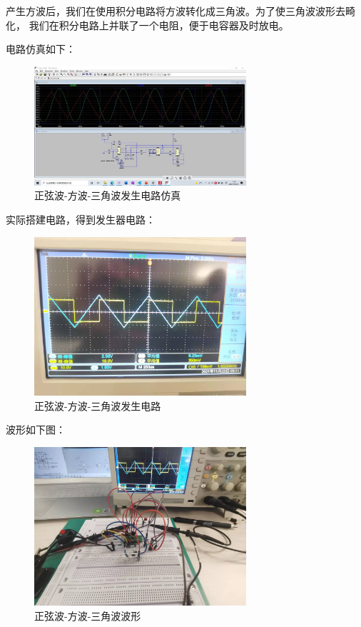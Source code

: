 \documentclass[UTF8]{ctexart}
\begin{document}
产生方波后，我们在使用积分电路将方波转化成三角波。为了使三角波波形去畸化，
我们在积分电路上并联了一个电阻，便于电容器及时放电。

电路仿真如下：

\begin{figure}[H]
        \centering
        \includegraphics[width =0.7\textwidth]{1-2.jpg}
        \caption{正弦波-方波-三角波发生电路仿真}
\end{figure}

实际搭建电路，得到发生器电路：

\begin{figure}[H]
        \centering
        \includegraphics[width =0.7\textwidth]{1-2-total-r.jpg}
        \caption{正弦波-方波-三角波发生电路}
\end{figure}

波形如下图：

\begin{figure}[H]
        \centering
        \includegraphics[width =0.7\textwidth]{1-2-r.jpg}
        \caption{正弦波-方波-三角波波形}
\end{figure}
\end{document}
